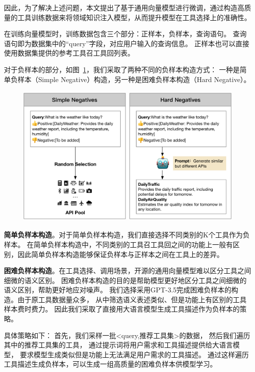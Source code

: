 因此，为了解决上述问题，本文提出了基于通用向量模型进行微调，通过构造高质量的工具训练数据来将领域知识注入模型，从而提升模型在工具选择上的准确性。

在训练向量模型时，训练数据包含三个部分：正样本，负样本，查询语句。
查询语句即为数据集中的“query”字段，对应用户输入的查询信息。
正样本也可以直接使用数据集提供的参考工具召工具回列表。

对于负样本的部分，如图~\ref{fig:negative-sample-generation}，我们采取了两种不同的负样本构造方式：
一种是简单负样本（Simple Negative）构造，另一种是困难负样本构造（Hard Negative）。

\begin{figure}[!htp]
  \vspace{1em}
  \centering
  \setlength{\abovecaptionskip}{10pt} %
  \includegraphics[height=7cm]{../assets/ch3-负样本构造.pdf}
  \label{fig:negative-sample-generation}
\end{figure}

\indent \textbf{简单负样本构造}。对于简单负样本构造，我们直接选择不同类别的K个工具作为负样本。
在简单负样本构造中，不同类别的工具召工具回之间的功能上一般有区别，因此简单负样本构造能够保证负样本与正样本之间在工具上的差异。

\indent \textbf{困难负样本构造}。在工具选择、调用场景，开源的通用向量模型难以区分工具之间细微的语义区别。
困难负样本构造的目的是帮助模型更好地区分工具之间细微的语义区别，帮助更好地应对噪声。
我们选择采用GPT-3.5完成困难负样本的构造。由于原工具数据量众多，
从中筛选语义表述类似、但是功能上有区别的工具样本费时费力。
因此我们采取了直接用大语言模型生成工具描述作为负样本的策略。

具体策略如下：
首先，我们采样一批<query,推荐工具集>的数据，
然后我们遍历其中的推荐工具集的工具，
通过提示词将用户需求和工具描述提供给大语言模型，
要求模型生成类似但是功能上无法满足用户需求的工具描述。
通过这样遍历工具描述生成负样本，可以生成一组高质量的困难负样本供模型学习。

